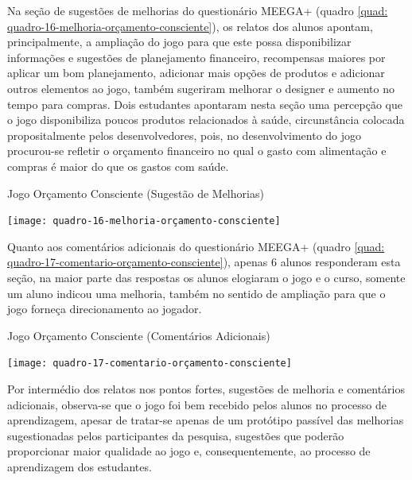 Na seção de sugestões de melhorias do questionário MEEGA+ (quadro \ref{quad: quadro-16-melhoria-orçamento-consciente}), os relatos dos alunos apontam, principalmente, a ampliação do jogo para que este possa disponibilizar informações e sugestões de planejamento financeiro, recompensas maiores por aplicar um bom planejamento, adicionar mais opções de produtos e adicionar outros elementos ao jogo, também sugeriram melhorar o designer e aumento no tempo para compras. Dois estudantes apontaram nesta seção uma percepção que o jogo disponibiliza poucos produtos relacionados à saúde, circunstância colocada propositalmente pelos desenvolvedores, pois, no desenvolvimento do jogo procurou-se refletir o orçamento financeiro no qual o gasto com alimentação e compras é maior do que os gastos com saúde.

\graphicspath{{quadros/}} 
\begin{quadro}[!ht]
\centering
\begin{minipage}{1.\textwidth}
\caption{Jogo Orçamento Consciente (Sugestão de Melhorias)}
\centering
\texttt{[image: quadro-16-melhoria-orçamento-consciente]}
\label{quad: quadro-16-melhoria-orçamento-consciente}
\end{minipage}
\end{quadro}

\newpage
Quanto aos comentários adicionais do questionário MEEGA+ (quadro \ref{quad: quadro-17-comentario-orçamento-consciente}), apenas 6 alunos responderam esta seção, na maior parte das respostas os alunos elogiaram o jogo e o curso, somente um aluno indicou uma melhoria, também no sentido de ampliação para que o jogo forneça direcionamento ao jogador.

\graphicspath{{quadros/}} 
\begin{quadro}[!ht]
\centering
\begin{minipage}{1.\textwidth}
\caption{Jogo Orçamento Consciente (Comentários Adicionais)}
\centering
\texttt{[image: quadro-17-comentario-orçamento-consciente]}
\label{quad: quadro-17-comentario-orçamento-consciente}
\end{minipage}
\end{quadro}

Por intermédio dos relatos nos pontos fortes, sugestões de melhoria e comentários adicionais, observa-se que o jogo foi bem recebido pelos alunos no processo de aprendizagem, apesar de tratar-se apenas de um protótipo passível das melhorias sugestionadas pelos participantes da pesquisa, sugestões que poderão proporcionar maior qualidade ao jogo e, consequentemente, ao processo de aprendizagem dos estudantes.

